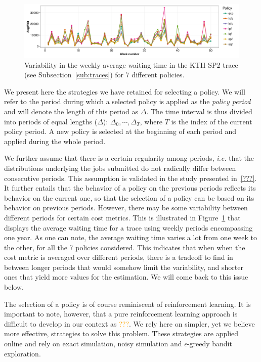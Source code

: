 \documentclass[sigconf]{acmart}
\begin{document}
\begin{figure}[ht]
  \centering
  \includegraphics[scale=0.6]{figures/variability.pdf}
  \caption{Variability in the weekly average waiting time in the KTH-SP2 trace (see Subsection~\ref{sub:traces}) for 7 different policies.}
  \label{fig:mosn}
\end{figure}

We present here the strategies we have retained for selecting a policy. We will refer to the period during which a selected policy is applied as the \textit{policy period} and will denote the length of this period as $\Delta$. The time interval is thus divided into periods of equal lengths ($\Delta$): $\Delta_0, \cdots, \Delta_T$, where $T$ is the index of the current policy period. A new policy is selected at the beginning of each period and applied during the whole period.

We further assume that there is a certain regularity among periods, \textit{i.e.} that the distributions underlying the jobs submitted do not radically differ between consecutive periods. This assumption is validated in the study presented in~\ref{???}. It further entails that the behavior of a policy on the previous periods reflects its behavior on the current one, so that the selection of a policy can be based on its behavior on previous periods. However, there may be some variability between different periods for certain cost metrics. This is illustrated in Figure~\ref{fig:mosn} that displays the average waiting time for a trace using weekly periods encompassing one year. As one can note, the average waiting time varies a lot from one week to the other, for all the 7 policies considered. This indicates that when when the cost metric is averaged over different periods, there is a tradeoff to find in between longer periods that would somehow limit the variability, and shorter ones that yield more values for the estimation. We will come back to this issue below.

The selection of a policy is of course reminiscent of reinforcement learning. It is important to note, however, that a pure reinforcement learning approach is difficult to develop in our context as \textcolor{orange}{???}. We rely here on simpler, yet we believe more effective, strategies to solve this problem. These strategies are applied online and rely on exact simulation, noisy simulation and $\epsilon$-greedy bandit exploration.
\end{document}
